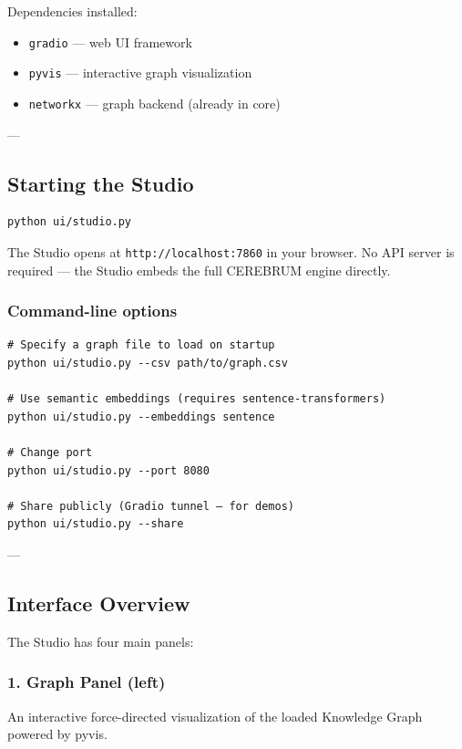 \documentclass[11pt,article,oneside]{memoir}
\begin{document}
Depend\-encies installed:
\begin{itemize}
\item \texttt{gradio} — web UI framework
\item \texttt{pyvis} — interactive graph visua\-lization
\item \texttt{networkx} — graph backend (already in core)

\end{itemize}
---

\subsection{Starting the Studio}

\begin{lstlisting}
python ui/studio.py
\end{lstlisting}

The Studio opens at \texttt{http://localhost:7860} in your browser. No API server is required — the Studio embeds the full CEREBRUM engine directly.

\subsubsection{Command-line options}

\begin{lstlisting}
# Specify a graph file to load on startup
python ui/studio.py --csv path/to/graph.csv

# Use semantic embeddings (requires sentence-transformers)
python ui/studio.py --embeddings sentence

# Change port
python ui/studio.py --port 8080

# Share publicly (Gradio tunnel — for demos)
python ui/studio.py --share
\end{lstlisting}

---

\subsection{Interface Overview}

The Studio has four main panels:

\subsubsection{1. Graph Panel (left)}
An interactive force-directed visua\-lization of the loaded Knowledge Graph powered by pyvis.
\end{document}
